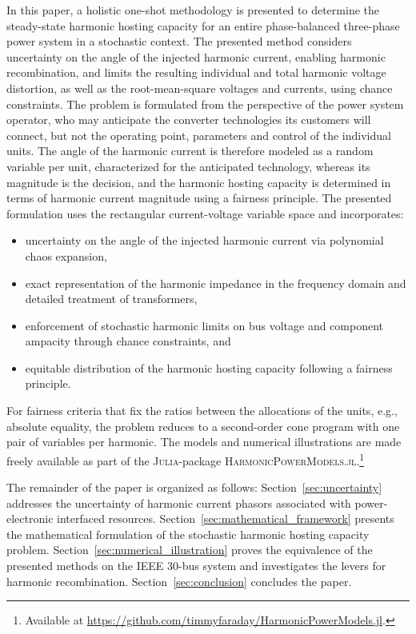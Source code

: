 In this paper, a holistic one-shot methodology is presented to determine the steady-state harmonic hosting capacity for an entire phase-balanced three-phase power system in a stochastic context. The presented method considers uncertainty on the angle of the injected harmonic current, enabling harmonic recombination, and limits the resulting individual and total harmonic voltage distortion, as well as the root-mean-square voltages and currents, using chance constraints. The problem is formulated from the perspective of the power system operator, who may anticipate the converter technologies its customers will connect, but not the operating point, parameters and control of the individual units. The angle of the harmonic current is therefore modeled as a random variable per unit, characterized for the anticipated technology, whereas its magnitude is the decision, and the harmonic hosting capacity is determined in terms of harmonic current magnitude using a fairness principle. The presented formulation uses the rectangular current-voltage variable space and incorporates:
\begin{itemize}
    \item uncertainty on the angle of the injected harmonic current via polynomial chaos expansion,
    \item exact representation of the harmonic impedance in the frequency domain and detailed treatment of transformers,
    \item enforcement of stochastic harmonic limits on bus voltage and component ampacity through chance constraints, and
    \item equitable distribution of the harmonic hosting capacity following a fairness principle.
\end{itemize}
For fairness criteria that fix the ratios between the allocations of the units, e.g., absolute equality, the problem reduces to a second-order cone program with one pair of variables per harmonic. %
The models and numerical illustrations are made freely available as part of the \textsc{Julia}-package \textsc{HarmonicPowerModels.jl}.\footnote{Available at \url{https://github.com/timmyfaraday/HarmonicPowerModels.jl}.}

The remainder of the paper is organized as follows: Section~\ref{sec:uncertainty} addresses the uncertainty of harmonic current phasors associated with power-electronic interfaced resources. Section~\ref{sec:mathematical_framework} presents the mathematical formulation of the stochastic harmonic hosting capacity problem. Section~\ref{sec:numerical_illustration} proves the equivalence of the presented methods on the IEEE 30-bus system and investigates the levers for harmonic recombination. Section~\ref{sec:conclusion} concludes the paper.
